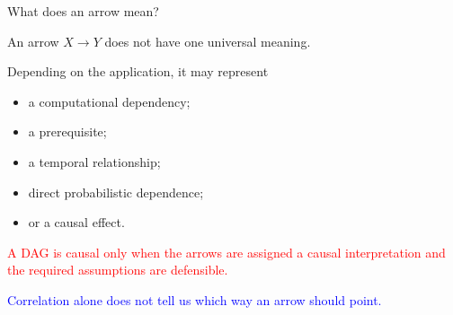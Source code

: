 \documentclass[aspectratio=43,11pt]{beamer}
\begin{document}
\begin{frame}{What does an arrow mean?}

An arrow \(X\rightarrow Y\) does not have one universal meaning.

\begin{block}{Depending on the application, it may represent}
\begin{itemize}
  \item a computational dependency;
  \item a prerequisite;
  \item a temporal relationship;
  \item direct probabilistic dependence;
  \item or a causal effect.
\end{itemize}
\end{block}

\pause

\textcolor{red}{A DAG is causal only when the arrows are assigned a causal
interpretation and the required assumptions are defensible.}

\medskip

\textcolor{blue}{Correlation alone does not tell us which way an arrow should point.}

\end{frame}
\end{document}
